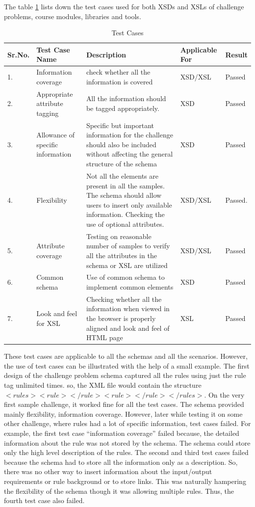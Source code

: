 \documentclass[11pt,letterpaper]{report}
\begin{document}
The table \ref{table:test} lists down the test cases used for both XSDs and XSLs of challenge problems, course modules, libraries and tools.
\begin{table}
\begin{tabular}{| l | p{2cm} | p{5cm} | p{2cm} | p{1cm} |}
\hline \textbf{Sr.No.} & \textbf{Test Case Name} & \textbf{Description} & \textbf{Applicable For} & \textbf{Result} \\ \hline 1. & Information coverage & check whether all the information is covered & XSD/XSL & Passed \\ 
\hline 2. & Appropriate attribute tagging & All the information should be tagged appropriately.  & XSD & Passed  \\  
\hline 3.& Allowance of specific information  & Specific but important information for the challenge should also be included without affecting the general structure of the schema & XSD & Passed \\ 
\hline 4.& Flexibility & Not all the elements are present in all the samples. The schema should allow users to insert only available information. Checking the use of optional attributes. & XSD/XSL & Passed. \\ 
\hline 5. & Attribute coverage & Testing on reasonable number of samples to verify all the attributes in the schema or XSL are utilized & XSD/XSL & Passed \\  
\hline 6. & Common schema & Use of common schema to implement common elements & XSD & Passed \\  
\hline 7. & Look and feel for XSL & Checking whether all the information when viewed in the browser is properly aligned and look and feel of HTML page & XSL & Passed \\ 
\hline
\end{tabular}
\caption[Table caption text]{Test Cases}
\label{table:test}
\end{table}
\pagebreak
These test cases are applicable to all the schemas and all the scenarios. However, the use of test cases can be illustrated with the help of a small example. The first design of the challenge problem schema captured all the rules using just the rule tag unlimited times. so, the XML file would contain the structure $<rules><rule></rule><rule></rule></rules>$. On the very first sample challenge, it worked fine for all the test cases. The schema provided mainly flexibility, information coverage. However, later while testing it on some other challenge, where rules had a lot of specific information, test cases failed. For example, the first test case ``information coverage'' failed because, the detailed information about the rule was not stored by the schema. The schema could store only the high level description of the rules. The second and third test cases failed because the schema had to store all the information only as a description. So, there was no other way to insert information about the input/output requirements or rule background or to store links. This was naturally hampering the flexibility of the schema though it was allowing multiple rules. Thus, the fourth test case also failed.
\end{document}
